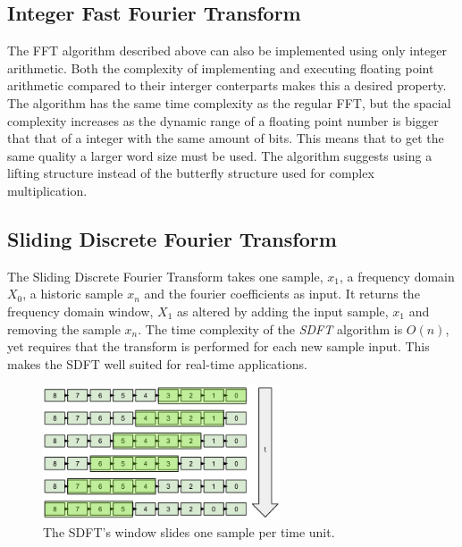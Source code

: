 \subsection{Integer Fast Fourier Transform} \label{appendix:IntFFT}
The FFT algorithm described above can also be implemented using only integer
arithmetic. Both the complexity of implementing and executing floating point
arithmetic compared to their interger conterparts makes this a desired property.
The algorithm has the same time complexity as the regular FFT, but the spacial
complexity increases as the dynamic range of a floating point number is bigger
that that of a integer with the same amount of bits. This means that to get
the same quality a larger word size must be used. The algorithm suggests
using a lifting structure instead of the butterfly structure used for complex
multiplication.

\subsection{Sliding Discrete Fourier Transform}\label{appendix:SDFT}
The Sliding Discrete Fourier Transform takes one sample, $x_1$, a frequency
domain $X_0$, a historic sample $x_n$ and the fourier coefficients as input.
It returns the frequency domain window, $X_1$ as altered by adding the input
sample, $x_1$ and removing the sample $x_n$. The time complexity of the {\it SDFT}
algorithm is $O(n)$, yet requires that the transform is performed for each
new sample input. This makes the SDFT well suited for real-time applications.

\begin{figure}[H]
    \centering
    \includegraphics[height=150px]{figures/theory/sdft_window_slide}
    \caption{The SDFT's window slides one sample per time unit.}
    \label{fig:sdft_window_slide}
\end{figure}